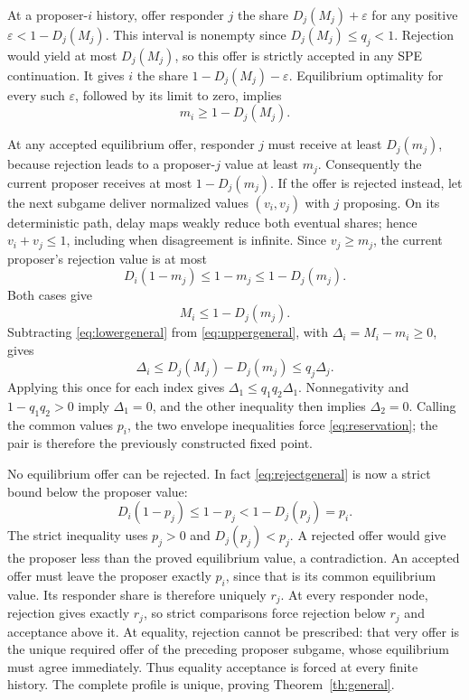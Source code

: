 \documentclass[11pt]{article}
\begin{document}
At a proposer-$i$ history, offer responder $j$ the share $D_j(M_j)+\varepsilon$ for any positive $\varepsilon<1-D_j(M_j)$. This interval is nonempty since $D_j(M_j)\le q_j<1$. Rejection would yield at most $D_j(M_j)$, so this offer is strictly accepted in any SPE continuation. It gives $i$ the share $1-D_j(M_j)-\varepsilon$. Equilibrium optimality for every such $\varepsilon$, followed by its limit to zero, implies
\begin{equation}\label{eq:lowergeneral}
 m_i\ge1-D_j(M_j).
\end{equation}

At any accepted equilibrium offer, responder $j$ must receive at least $D_j(m_j)$, because rejection leads to a proposer-$j$ value at least $m_j$. Consequently the current proposer receives at most $1-D_j(m_j)$. If the offer is rejected instead, let the next subgame deliver normalized values $(v_i,v_j)$ with $j$ proposing. On its deterministic path, delay maps weakly reduce both eventual shares; hence $v_i+v_j\le1$, including when disagreement is infinite. Since $v_j\ge m_j$, the current proposer's rejection value is at most
\begin{equation}\label{eq:rejectgeneral}
 D_i(1-m_j)\le1-m_j\le1-D_j(m_j).
\end{equation}
Both cases give
\begin{equation}\label{eq:uppergeneral}
 M_i\le1-D_j(m_j).
\end{equation}
Subtracting \eqref{eq:lowergeneral} from \eqref{eq:uppergeneral}, with $\Delta_i=M_i-m_i\ge0$, gives
\begin{equation}
 \Delta_i\le D_j(M_j)-D_j(m_j)\le q_j\Delta_j.
\end{equation}
Applying this once for each index gives $\Delta_1\le q_1q_2\Delta_1$. Nonnegativity and $1-q_1q_2>0$ imply $\Delta_1=0$, and the other inequality then implies $\Delta_2=0$. Calling the common values $p_i$, the two envelope inequalities force \eqref{eq:reservation}; the pair is therefore the previously constructed fixed point.

No equilibrium offer can be rejected. In fact \eqref{eq:rejectgeneral} is now a strict bound below the proposer value:
\begin{equation}\label{eq:strictgeneral}
 D_i(1-p_j)\le1-p_j<1-D_j(p_j)=p_i.
\end{equation}
The strict inequality uses $p_j>0$ and $D_j(p_j)<p_j$. A rejected offer would give the proposer less than the proved equilibrium value, a contradiction. An accepted offer must leave the proposer exactly $p_i$, since that is its common equilibrium value. Its responder share is therefore uniquely $r_j$. At every responder node, rejection gives exactly $r_j$, so strict comparisons force rejection below $r_j$ and acceptance above it. At equality, rejection cannot be prescribed: that very offer is the unique required offer of the preceding proposer subgame, whose equilibrium must agree immediately. Thus equality acceptance is forced at every finite history. The complete profile is unique, proving Theorem~\ref{th:general}.
\end{document}
